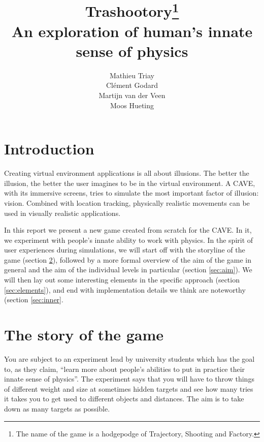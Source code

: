 \documentclass[a4paper]{article}
\title{Trashootory\footnote{The name of the game is a hodgepodge of Trajectory, Shooting and Factory.} \\ An exploration of human's innate sense of physics}
\author{Mathieu Triay \\ Cl\'ement Godard \\ Martijn van der Veen \\ Moos
Hueting}
\begin{document}
\maketitle

\tableofcontents
\pagebreak



\section{Introduction}
Creating virtual environment applications is all about illusions. The better the
illusion, the better the user imagines to be in the virtual environment. A CAVE, 
with its immersive screens, tries to simulate the most important factor of illusion: 
vision. Combined with location tracking, physically realistic movements can be used 
in visually realistic applications.

In this report we present a new game created from scratch for the CAVE. In it, we experiment
with people's innate ability to work with physics. In the spirit of user experiences during
simulations, we will start off with the storyline of the game (section \ref{sec:story}),
followed by a more formal overview of the aim of the game in general and the aim of the
individual levels in particular (section \ref{sec:aim}). We will then lay out some
interesting elements in the specific approach (section \ref{sec:elements}), and end with
implementation details we think are noteworthy (section \ref{sec:inner}.


\section{The story of the game}
\label{sec:story}
You are subject to an experiment lead by university students which has the goal to, as they claim, 
``learn more about people's abilities to put in practice their innate sense of
physics''. The experiment says that you will have to throw things of different
weight and size at sometimes hidden targets and see how many tries it takes you
to get used to different objects and distances. The aim is to take down as many
targets as possible.
\end{document}
